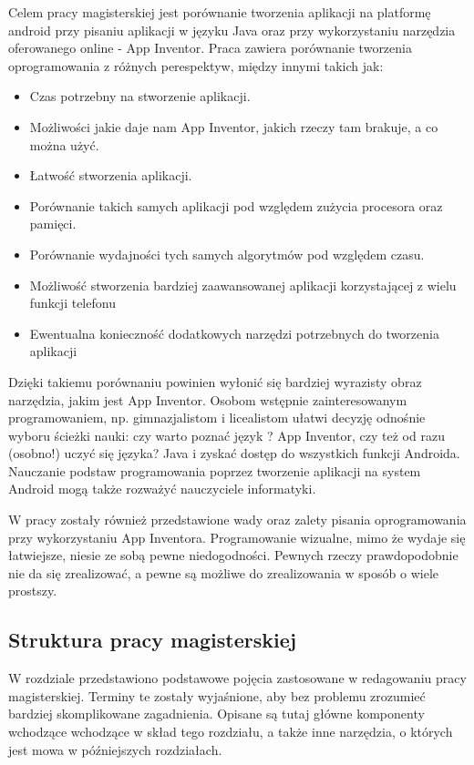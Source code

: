 Celem pracy magisterskiej jest porównanie tworzenia aplikacji na platformę android przy pisaniu aplikacji w języku Java oraz przy wykorzystaniu narzędzia oferowanego online - App Inventor. Praca zawiera porównanie tworzenia oprogramowania z różnych perespektyw, między innymi takich jak:
\begin{itemize}
\item Czas potrzebny na stworzenie aplikacji.
\item Możliwości jakie daje nam App Inventor, jakich rzeczy tam brakuje, a co można użyć.
\item Łatwość stworzenia aplikacji.
\item Porównanie takich samych aplikacji pod względem zużycia procesora oraz pamięci.
\item Porównanie wydajności tych samych algorytmów pod względem czasu.
\item Możliwość stworzenia bardziej zaawansowanej aplikacji korzystającej z wielu funkcji telefonu
\item Ewentualna konieczność dodatkowych narzędzi potrzebnych do tworzenia aplikacji
\end{itemize}

Dzięki takiemu porównaniu powinien wyłonić się bardziej wyrazisty obraz narzędzia, jakim jest App Inventor.  Osobom wstępnie zainteresowanym programowaniem, np.  gimnazjalistom i licealistom ułatwi decyzję odnośnie wyboru ścieżki nauki: czy warto poznać język ? App Inventor, czy też od razu (osobno!) uczyć się języka?  Java i zyskać dostęp do wszystkich funkcji Androida. Nauczanie podstaw programowania poprzez tworzenie aplikacji na system Android mogą także  rozważyć nauczyciele informatyki. 


W pracy zostały również przedstawione wady oraz zalety pisania oprogramowania przy wykorzystaniu App Inventora. Programowanie wizualne, mimo że wydaje się łatwiejsze, niesie ze sobą pewne niedogodności. Pewnych rzeczy prawdopodobnie nie da się zrealizować, a pewne są możliwe do zrealizowania w sposób o wiele prostszy. 


\subsection{Struktura pracy magisterskiej}

W rozdziale  przedstawiono podstawowe pojęcia zastosowane w redagowaniu pracy magisterskiej. Terminy te zostały wyjaśnione, aby bez problemu zrozumieć bardziej skomplikowane zagadnienia. Opisane są tutaj główne komponenty wchodzące wchodzące w skład tego rozdziału, a także inne narzędzia, o których jest mowa w późniejszych rozdziałach.

